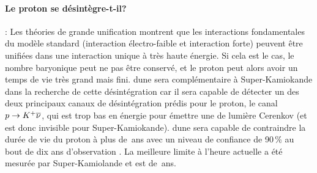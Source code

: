       \paragraph{Le proton se désintègre-t-il?} : Les théories de grande unification\cite{Pati1973} montrent que les interactions fondamentales du modèle standard (interaction électro-faible et interaction forte) peuvent être unifiées dans une interaction unique à très haute énergie. Si cela est le cas, le nombre baryonique peut ne pas être conservé, et le proton peut alors avoir un temps de vie très grand mais fini. \gls{dune} sera complémentaire à Super-Kamiokande dans la recherche de cette désintégration car il sera capable de détecter un des deux principaux canaux de désintégration prédis pour le proton, le canal $p\to K^+\overline{\nu}$, qui est trop bas en énergie pour émettre une de lumière Cerenkov (et est donc invisible pour Super-Kamiokande). \gls{dune} sera capable de contraindre la durée de vie du proton à plus de \,ans avec un niveau de confiance de 90\,\% au bout de dix ans d'observation \cite{Collaboration2015}. La meilleure limite à l'heure actuelle a été mesurée par Super-Kamiolande et est de \,ans\cite{KH-website}.
%        
        
